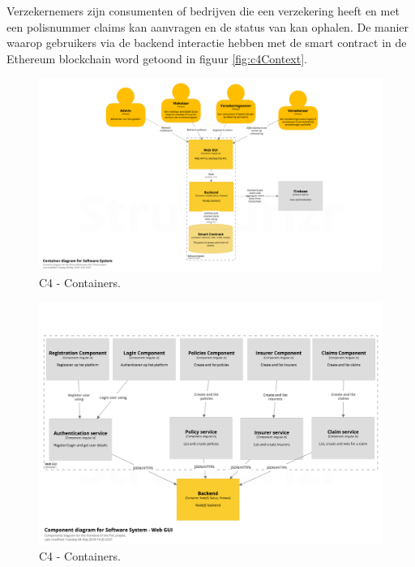 Verzekernemers zijn consumenten of bedrijven die een verzekering heeft en met een polisnummer claims kan aanvragen en de status van kan ophalen. De manier waarop gebruikers via de backend interactie hebben met de smart contract in de Ethereum blockchain word getoond in figuur \ref{fig:c4Context}.

\begin{figure}[h!]
    \begin{center}
        \includegraphics[width=\paperwidth-100]{images/containers}
        \caption{C4 - Containers.}
        \label{fig:c4Containers}
    \end{center}
\end{figure}

\begin{figure}[h!]
    \begin{center}
        \includegraphics[width=\paperwidth-100]{images/components}
        \caption{C4 - Containers.}
        \label{fig:c4Containers}
    \end{center}
\end{figure}

